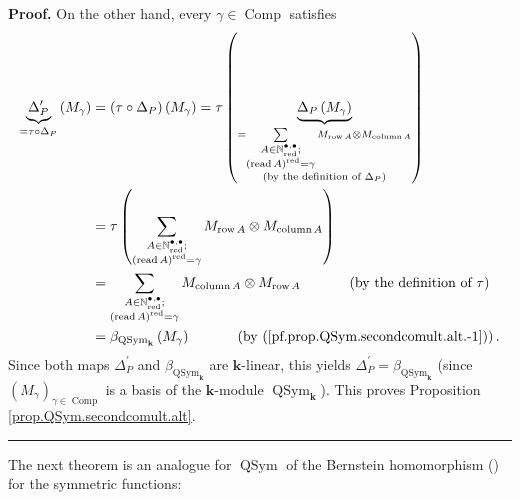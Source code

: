 \documentclass
[numbers=enddot,12pt,final,onecolumn,notitlepage,abstracton]{scrartcl}%
\theoremstyle{definition}
\newenvironment{proof}[1][Proof]{\noindent\textbf{#1.} }{\ \rule{0.5em}{0.5em}}
\let\sumnonlimits\sum
\renewcommand{\sum}{\sumnonlimits\limits}
\begin{document}
\begin{proof}
On the other hand, every $\gamma\in\operatorname*{Comp}$ satisfies%
\begin{align*}
\underbrace{\Delta_{P}^{\prime}}_{=\tau\circ\Delta_{P}}\left(  M_{\gamma
}\right)   &  =\left(  \tau\circ\Delta_{P}\right)  \left(  M_{\gamma}\right)
=\tau\left(  \underbrace{\Delta_{P}\left(  M_{\gamma}\right)  }%
_{\substack{=\sum_{\substack{A\in\mathbb{N}_{\operatorname*{red}}%
^{\bullet,\bullet};\\\left(  \operatorname*{read}A\right)
^{\operatorname*{red}}=\gamma}}M_{\operatorname*{row}A}\otimes
M_{\operatorname*{column}A}\\\text{(by the definition of }\Delta_{P}\text{)}%
}}\right) \\
&  =\tau\left(  \sum_{\substack{A\in\mathbb{N}_{\operatorname*{red}}%
^{\bullet,\bullet};\\\left(  \operatorname*{read}A\right)
^{\operatorname*{red}}=\gamma}}M_{\operatorname*{row}A}\otimes
M_{\operatorname*{column}A}\right) \\
&  =\sum_{\substack{A\in\mathbb{N}_{\operatorname*{red}}^{\bullet,\bullet
}\text{;}\\\left(  \operatorname*{read}A\right)  ^{\operatorname*{red}}%
=\gamma}}M_{\operatorname*{column}A}\otimes M_{\operatorname*{row}%
A}\ \ \ \ \ \ \ \ \ \ \left(  \text{by the definition of }\tau\right) \\
&  =\beta_{\operatorname*{QSym}\nolimits_{\mathbf{k}}}\left(  M_{\gamma
}\right)  \ \ \ \ \ \ \ \ \ \ \left(  \text{by
(\ref{pf.prop.QSym.secondcomult.alt.-1})}\right)  .
\end{align*}
Since both maps $\Delta_{P}^{\prime}$ and $\beta_{\operatorname*{QSym}%
\nolimits_{\mathbf{k}}}$ are $\mathbf{k}$-linear, this yields $\Delta
_{P}^{\prime}=\beta_{\operatorname*{QSym}\nolimits_{\mathbf{k}}}$ (since
$\left(  M_{\gamma}\right)  _{\gamma\in\operatorname*{Comp}}$ is a basis of
the $\mathbf{k}$-module $\operatorname*{QSym}\nolimits_{\mathbf{k}}$). This
proves Proposition \ref{prop.QSym.secondcomult.alt}.
\end{proof}

The next theorem is an analogue for $\operatorname*{QSym}$ of the Bernstein
homomorphism (\cite[\S 18.24]{HazeWitt}) for the symmetric functions:
\end{document}
